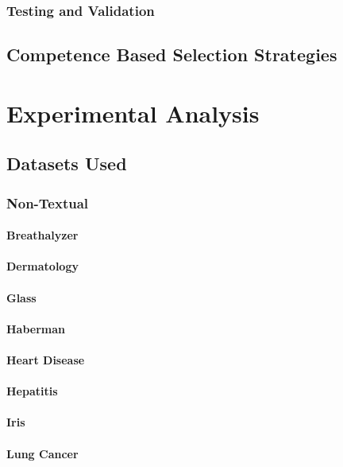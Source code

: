 \documentclass[a4paper,11pt]{report}
\begin{document}
\subsection{Testing and Validation}

\section{Competence Based Selection Strategies}
\chapter{Experimental Analysis}
\section{Datasets Used}
\subsection{Non-Textual}
\subsubsection*{Breathalyzer}\label{sec:breathalyzer}
\subsubsection*{Dermatology}\label{sec:dermatology}
\subsubsection*{Glass}\label{sec:glass}
\subsubsection*{Haberman}\label{sec:haberman}
\subsubsection*{Heart Disease}\label{sec:heart_disease}
\subsubsection*{Hepatitis}\label{sec:hepatitis}
\subsubsection*{Iris}\label{sec:iris}
\subsubsection*{Lung Cancer}\label{sec:lung_cancer}
\end{document}
